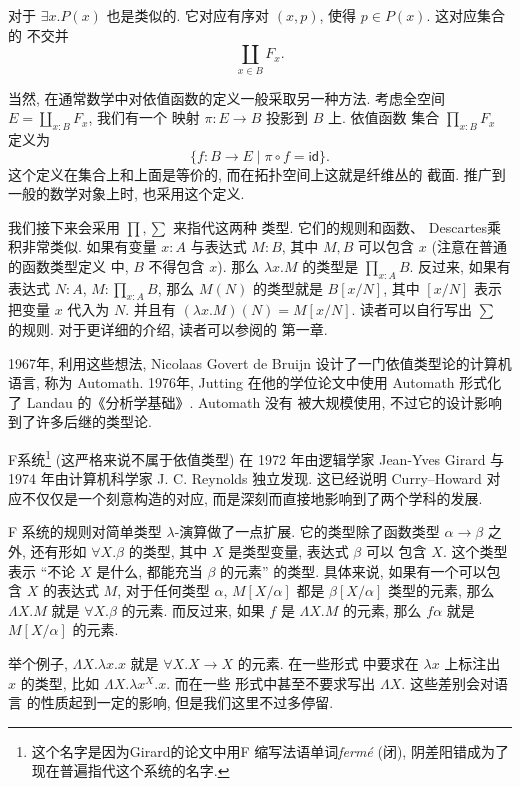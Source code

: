 \documentclass[UTF8]{ctexbook}
\newcommand{\cons}[1]{\textsf{#1}}
\theoremstyle{plain}
\theoremstyle{definition}
\theoremstyle{remark}
\begin{document}
对于 \(\exists x. P(x)\) 也是类似的. 它对应有序对
\((x, p)\), 使得 \(p \in P(x)\). 这对应集合的
不交并
\[\coprod_{x\in B} F_x.\]

当然, 在通常数学中对依值函数的定义一般采取另一种方法.
考虑全空间 \(E = \coprod_{x:B} F_x\), 我们有一个
映射 \(\pi : E \to B\) 投影到 \(B\) 上. 依值函数
集合 \(\prod_{x:B} F_x\) 定义为
\[\{f : B \to E \mid \pi \circ f = \cons{id}\}.\]
这个定义在集合上和上面是等价的, 而在拓扑空间上这就是纤维丛的
截面. 推广到一般的数学对象上时, 也采用这个定义.

我们接下来会采用 \(\prod, \sum\) 来指代这两种
类型. 它们的规则和函数、 Descartes乘积非常类似.
如果有变量 \(x : A\) 与表达式 \(M : B\), 其中
\(M, B\) 可以包含 \(x\) (注意在普通的函数类型定义
中, \(B\) 不得包含 \(x\)).
那么 \(\lambda x. M\) 的类型是 \(\prod_{x:A}B\).
反过来,
如果有表达式 \(N : A\), \(M : \prod_{x:A} B\),
那么 \(M(N)\) 的类型就是 \(B[x/N]\), 其中 \([x/N]\)
表示把变量 \(x\) 代入为 \(N\). 并且有 \((\lambda x.M)(N) = M[x/N]\).
读者可以自行写出 \(\sum\) 的规则.
对于更详细的介绍, 读者可以参阅\cite{ufp:2013:hottbook}的
第一章.

1967年, 利用这些想法, Nicolaas Govert de Bruijn
设计了一门依值类型论的计算机语言, 称为 Automath.
1976年, Jutting 在他的学位论文\cite{automath:1994:automath}中使用 Automath
形式化了 Landau 的《分析学基础》. Automath 没有
被大规模使用, 不过它的设计影响到了许多后继的类型论.

F系统\footnote{这个名字是因为Girard的论文中用F
缩写法语单词\emph{ferm\'e} (闭), 阴差阳错成为了
现在普遍指代这个系统的名字.} (这严格来说不属于依值类型)
在 1972 年由逻辑学家 Jean-Yves Girard \cite{girard:1972:systemf}
与 1974 年由计算机科学家 J. C. Reynolds \cite{reynolds:1974:systemf} 独立发现.
这已经说明 Curry--Howard 对应不仅仅是一个刻意构造的对应,
而是深刻而直接地影响到了两个学科的发展.

F 系统的规则对简单类型 \(\lambda\)-演算做了一点扩展.
它的类型除了函数类型 \(\alpha \to \beta\) 之外,
还有形如 \(\forall X. \beta\) 的类型, 其中
\(X\) 是类型变量, 表达式 \(\beta\) 可以
包含 \(X\). 这个类型表示 “不论 \(X\) 是什么,
都能充当 \(\beta\) 的元素” 的类型. 具体来说,
如果有一个可以包含 \(X\) 的表达式 \(M\),
对于任何类型 \(\alpha\), \(M[X/\alpha]\) 都是
\(\beta[X/\alpha]\) 类型的元素, 那么
\(\Lambda X. M\) 就是 \(\forall X. \beta\) 的元素.
而反过来, 如果 \(f\) 是 \(\Lambda X. M\) 的元素,
那么 \(f \alpha\) 就是 \(M[X/\alpha]\) 的元素.

举个例子, \(\Lambda X. \lambda x. x\)
就是 \(\forall X. X \to X\) 的元素. 在一些形式
中要求在 \(\lambda x\) 上标注出 \(x\) 的类型,
比如 \(\Lambda X. \lambda x^X. x\). 而在一些
形式中甚至不要求写出 \(\Lambda X\). 这些差别会对语言
的性质起到一定的影响, 但是我们这里不过多停留.
\end{document}
